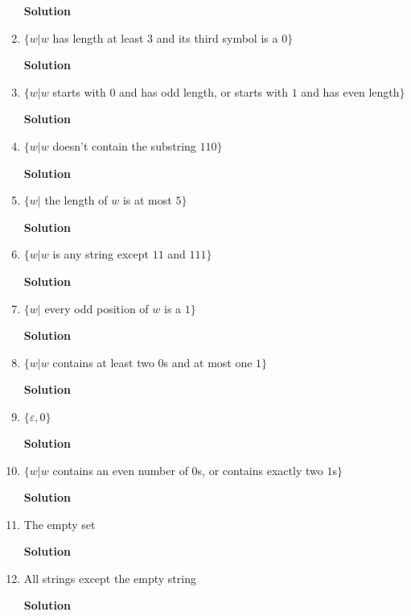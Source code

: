 \documentclass{article}
\begin{document}
\begin{empfile}
\begin{enumerate}[\bfseries a.]
\textbf{Solution}

\item $\{w| w$ has length at least $3$ and its third symbol is a $0\}$

\textbf{Solution}

\item $\{w| w$ starts with $0$ and has odd length, or starts with
$1$ and has even length$\}$

\textbf{Solution}

\item $\{w| w$ doesn't contain the substring $110\}$

\textbf{Solution}

\item $\{w|$ the length of $w$ is at most $5\}$

\textbf{Solution}

\item $\{w| w$ is any string except $11$ and $111\}$

\textbf{Solution}

\item $\{w|$ every odd position of $w$ is a $1\}$

\textbf{Solution}

\item $\{w| w$ contains at least two $0$s and at most one $1\}$

\textbf{Solution}

\item $\{\varepsilon, 0\}$

\textbf{Solution}

\item $\{w| w$ contains an even number of $0$s, or contains exactly
two $1$s$\}$

\textbf{Solution}

\item The empty set

\textbf{Solution}

\item All strings except the empty string

\textbf{Solution}
\end{enumerate}




\end{empfile}
\end{document}
